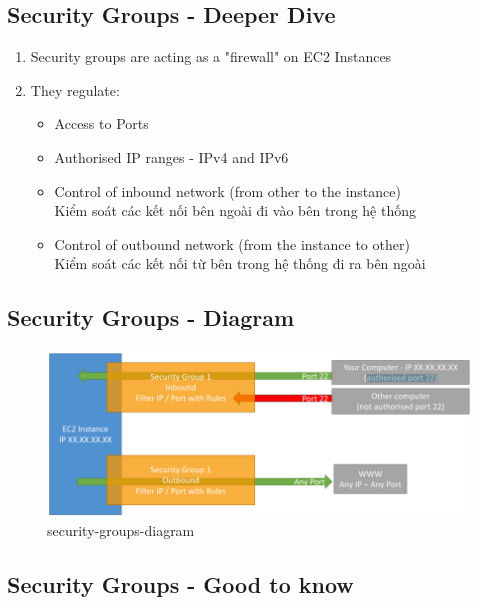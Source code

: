 \subsection{Security Groups - Deeper Dive}
\begin{enumerate}
	\item Security groups are acting as a "firewall" on EC2 Instances
	\item They regulate:
	\begin{itemize}
		\item Access to Ports
		\item Authorised IP ranges - IPv4 and IPv6
		\item Control of inbound network (from other to the instance) \\ Kiểm soát các kết nối bên ngoài đi vào bên trong hệ thống
		\item Control of outbound network (from the instance to other) \\ Kiểm soát các kết nối từ bên trong hệ thống đi ra bên ngoài
	\end{itemize}
\end{enumerate}

\subsection{Security Groups - Diagram}

\begin{figure}[htbp]
	\centering
	\includegraphics[width=1\linewidth]{images/security-groups-diagram.png}
	\caption{security-groups-diagram}
	\label{fig:security-groups-diagram}
\end{figure}

\subsection{Security Groups - Good to know}


